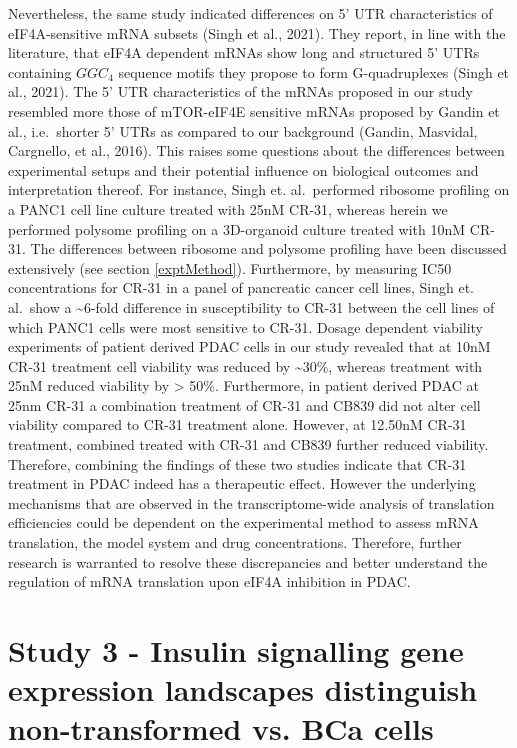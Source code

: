 \documentclass[
  12pt,
  openany]{book}
\begin{document}
Nevertheless, the same study indicated differences on 5' UTR characteristics of eIF4A-sensitive mRNA subsets (Singh et al., 2021). They report, in line with the literature, that eIF4A dependent mRNAs show long and structured 5' UTRs containing \(GGC_4\) sequence motifs they propose to form G-quadruplexes (Singh et al., 2021). The 5' UTR characteristics of the mRNAs proposed in our study resembled more those of mTOR-eIF4E sensitive mRNAs proposed by Gandin et al., i.e.~shorter 5' UTRs as compared to our background (Gandin, Masvidal, Cargnello, et al., 2016). This raises some questions about the differences between experimental setups and their potential influence on biological outcomes and interpretation thereof. For instance, Singh et. al.~performed ribosome profiling on a PANC1 cell line culture treated with 25nM CR-31, whereas herein we performed polysome profiling on a 3D-organoid culture treated with 10nM CR-31. The differences between ribosome and polysome profiling have been discussed extensively (see section \ref{exptMethod}). Furthermore, by measuring IC50 concentrations for CR-31 in a panel of pancreatic cancer cell lines, Singh et. al.~show a \textasciitilde6-fold difference in susceptibility to CR-31 between the cell lines of which PANC1 cells were most sensitive to CR-31. Dosage dependent viability experiments of patient derived PDAC cells in our study revealed that at 10nM CR-31 treatment cell viability was reduced by \textasciitilde30\%, whereas treatment with 25nM reduced viability by \textgreater{} 50\%. Furthermore, in patient derived PDAC at 25nm CR-31 a combination treatment of CR-31 and CB839 did not alter cell viability compared to CR-31 treatment alone. However, at 12.50nM CR-31 treatment, combined treated with CR-31 and CB839 further reduced viability. Therefore, combining the findings of these two studies indicate that CR-31 treatment in PDAC indeed has a therapeutic effect. However the underlying mechanisms that are observed in the transcriptome-wide analysis of translation efficiencies could be dependent on the experimental method to assess mRNA translation, the model system and drug concentrations. Therefore, further research is warranted to resolve these discrepancies and better understand the regulation of mRNA translation upon eIF4A inhibition in PDAC.
\newline

\section{Study 3 - Insulin signalling gene expression landscapes distinguish non-transformed vs. BCa cells}
\end{document}
